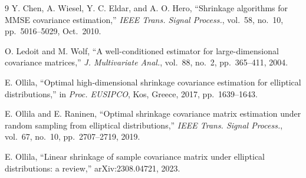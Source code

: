 \documentclass[journal]{IEEEtran}
\begin{document}
\begin{thebibliography}{9}
Y. Chen, A. Wiesel, Y. C. Eldar, and A. O. Hero, ``Shrinkage algorithms for MMSE covariance estimation,''
\emph{IEEE Trans. Signal Process.}, vol.~58, no.~10, pp.~5016--5029, Oct.~2010.

O. Ledoit and M. Wolf, ``A well-conditioned estimator for large-dimensional covariance matrices,''
\emph{J. Multivariate Anal.}, vol.~88, no.~2, pp.~365--411, 2004.

E. Ollila, ``Optimal high-dimensional shrinkage covariance estimation for elliptical distributions,''
in \emph{Proc. EUSIPCO}, Kos, Greece, 2017, pp.~1639--1643.

E. Ollila and E. Raninen, ``Optimal shrinkage covariance matrix estimation under random sampling
from elliptical distributions,''
\emph{IEEE Trans. Signal Process.}, vol.~67, no.~10, pp.~2707--2719, 2019.

E. Ollila, ``Linear shrinkage of sample covariance matrix under elliptical distributions: a review,''
arXiv:2308.04721, 2023.
\end{thebibliography}
\end{document}
